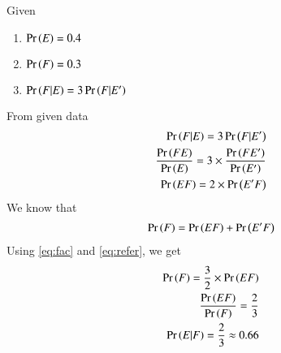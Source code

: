 Given
\begin{enumerate}
\item $\Pr\left(E\right)=0.4$
\item $\Pr\left(F\right)=0.3$
\item $\Pr\left(F|E\right)=3 \Pr\left(F|E'\right)$
\end{enumerate}
From given data
\begin{align}
\Pr\left(F|E\right)=3 \Pr\left(F|E'\right)\\
\frac{\Pr\left(FE\right)}{\Pr\left(E\right)}=3\times \frac{\Pr\left(FE'\right)}{\Pr\left(E'\right)}\\
\Pr\left(EF\right)=2\times\Pr\left(E'F\right)\label{eq:fac}
\end{align}
We know that
\begin{align}
\Pr\left(F\right)=\Pr\left(EF\right)+\Pr\left(E'F\right) \label{eq:refer}
\end{align}
Using \eqref{eq:fac} and \eqref{eq:refer}, we get
\begin{align}
\Pr\left(F\right)=\frac{3}{2}\times\Pr\left(EF\right)\\
\frac{\Pr\left(EF\right)}{\Pr\left(F\right)}=\frac{2}{3}\\
\Pr\left(E|F\right)=\frac{2}{3}\approx 0.66
\end{align}